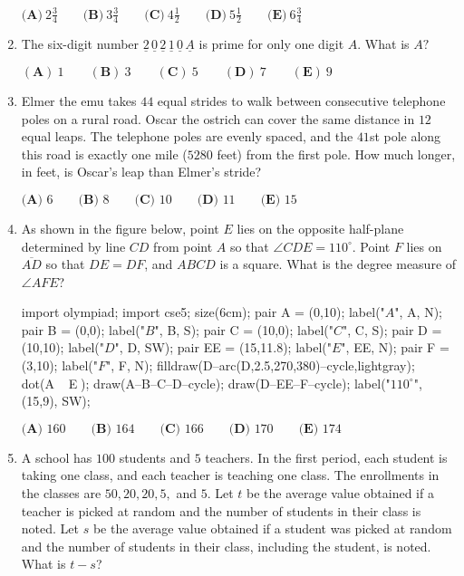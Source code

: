 \documentclass{article}
\begin{document}
\begin{enumerate}[label=\arabic*., itemsep=0.5em]
\(\textbf{(A)}\ 2 \frac{3}{4}  \qquad\textbf{(B)}\  3 \frac{3}{4} \qquad\textbf{(C)}\  4 \frac{1}{2} \qquad\textbf{(D)}\
 5 \frac{1}{2} \qquad\textbf{(E)}\ 6 \frac{3}{4}\)\par \vspace{0.5em}\item The six-digit number \(\underline{2}\,\underline{0}\,\underline{2}\,\underline{1}\,\underline{0}\,\underline{A}\) is prime for only one digit \(A.\) What is \(A?\)

\((\textbf{A})\: 1\qquad(\textbf{B}) \: 3\qquad(\textbf{C}) \: 5 \qquad(\textbf{D}) \: 7\qquad(\textbf{E}) \: 9\)\par \vspace{0.5em}\item Elmer the emu takes \(44\) equal strides to walk between consecutive telephone poles on a rural road. Oscar the ostrich can cover the same distance in \(12\) equal leaps. The telephone poles are evenly spaced, and the \(41\)st pole along this road is exactly one mile (\(5280\) feet) from the first pole. How much longer, in feet, is Oscar's leap than Elmer's stride?

\(\textbf{(A) }6\qquad\textbf{(B) }8\qquad\textbf{(C) }10\qquad\textbf{(D) }11\qquad\textbf{(E) }15\)\par \vspace{0.5em}\item As shown in the figure below, point \(E\) lies on the opposite half-plane determined by line \(CD\) from point \(A\) so that \(\angle CDE = 110^\circ\). Point \(F\) lies on \(\overline{AD}\) so that \(DE=DF\), and \(ABCD\) is a square. What is the degree measure of \(\angle AFE\)?


\begin{center}
\begin{asy}
import olympiad;
import cse5;
size(6cm);
pair A = (0,10);
label("$A$", A, N);
pair B = (0,0);
label("$B$", B, S);
pair C = (10,0);
label("$C$", C, S);
pair D = (10,10);
label("$D$", D, SW);
pair EE = (15,11.8);
label("$E$", EE, N);
pair F = (3,10);
label("$F$", F, N);
filldraw(D--arc(D,2.5,270,380)--cycle,lightgray);
dot(A^^B^^C^^D^^EE^^F);
draw(A--B--C--D--cycle);
draw(D--EE--F--cycle);
label("$110^\circ$", (15,9), SW);
\end{asy}
\end{center}


\(\textbf{(A) }160\qquad\textbf{(B) }164\qquad\textbf{(C) }166\qquad\textbf{(D) }170\qquad\textbf{(E) }174\)\par \vspace{0.5em}\item A school has \(100\) students and \(5\) teachers. In the first period, each student is taking one class, and each teacher is teaching one class. The enrollments in the classes are \(50, 20, 20, 5, \) and \(5\). Let \(t\) be the average value obtained if a teacher is picked at random and the number of students in their class is noted. Let \(s\) be the average value obtained if a student was picked at random and the number of students in their class, including the student, is noted. What is \(t-s\)?


\end{enumerate}
\end{document}
